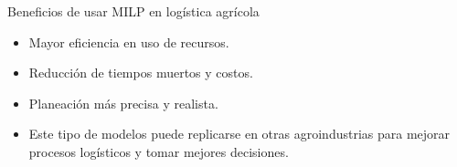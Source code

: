 \documentclass{beamer}
\begin{document}
\begin{frame}{Beneficios de usar MILP en logística agrícola}
  \begin{itemize}
    \item Mayor eficiencia en uso de recursos.
    \item Reducción de tiempos muertos y costos.
    \item Planeación más precisa y realista.
    \item Este tipo de modelos puede replicarse en otras agroindustrias para mejorar procesos logísticos y tomar mejores decisiones.
  \end{itemize}
\end{frame}
\end{document}
